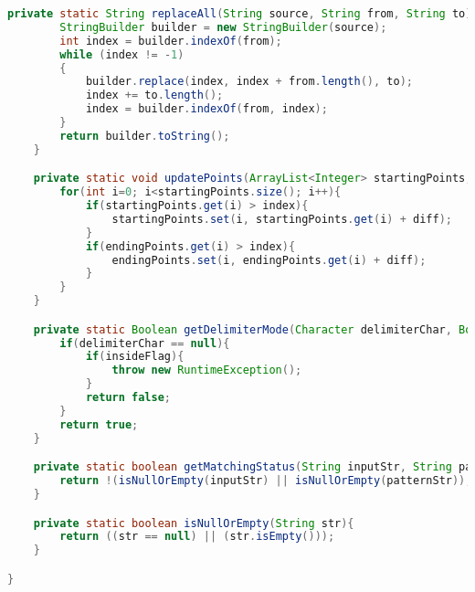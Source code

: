 \documentclass{article}
\begin{document}
\begin{lstlisting}[language=Java]
    private static String replaceAll(String source, String from, String to){
        StringBuilder builder = new StringBuilder(source);
        int index = builder.indexOf(from);
        while (index != -1)
        {
            builder.replace(index, index + from.length(), to);
            index += to.length();
            index = builder.indexOf(from, index);
        }
        return builder.toString();
    }

    private static void updatePoints(ArrayList<Integer> startingPoints, ArrayList<Integer> endingPoints, int index, int diff){
        for(int i=0; i<startingPoints.size(); i++){
            if(startingPoints.get(i) > index){
                startingPoints.set(i, startingPoints.get(i) + diff);
            }
            if(endingPoints.get(i) > index){
                endingPoints.set(i, endingPoints.get(i) + diff);
            }
        }
    }

    private static Boolean getDelimiterMode(Character delimiterChar, Boolean insideFlag) throws RuntimeException{
        if(delimiterChar == null){
            if(insideFlag){
                throw new RuntimeException();
            }
            return false;
        }
        return true;
    }

    private static boolean getMatchingStatus(String inputStr, String patternStr){
        return !(isNullOrEmpty(inputStr) || isNullOrEmpty(patternStr));
    }

    private static boolean isNullOrEmpty(String str){
        return ((str == null) || (str.isEmpty()));
    }

}
\end{lstlisting}
\end{document}
